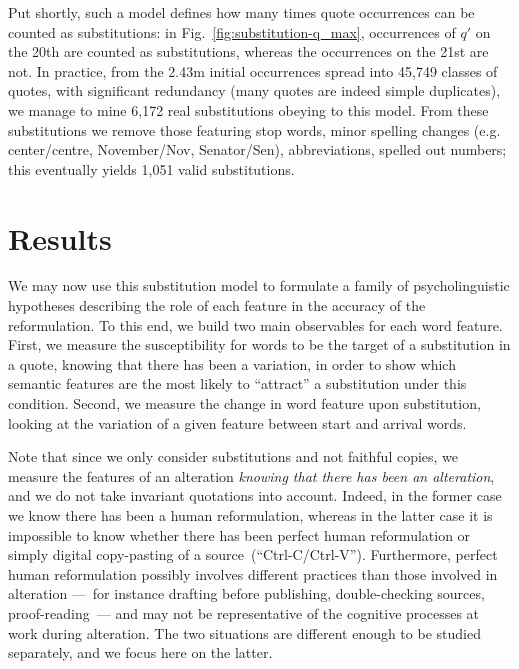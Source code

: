 \medskip
Put shortly, such a model defines how many times quote occurrences can be counted as substitutions: in Fig.~\ref{fig:substitution-q_max}, occurrences of $q'$ on the 20th are counted as substitutions, whereas the occurrences on the 21st are not.  In practice, from the 2.43m initial occurrences spread into 45,749 classes of quotes, with significant redundancy (many quotes are indeed simple duplicates), we manage to mine 6,172 real substitutions obeying to this model. From these substitutions we remove those featuring stop words, minor spelling changes (e.g. center/centre, November/Nov, Senator/Sen), abbreviations, spelled out numbers; this eventually yields 1,051 valid substitutions.


\section{Results}\label{sec:results}

We may now use this substitution model to formulate a family of psycholinguistic hypotheses describing the role of each feature in the accuracy of the reformulation.  To this end, we build two main observables for each word feature.
First, we measure the susceptibility for words to be the target of a substitution in a quote, knowing that there has been a variation, in order to show which semantic features are the most likely to ``attract'' a substitution under this condition. Second, we measure the change in word feature upon substitution, looking at the variation of a given feature between start and arrival words.

Note that since we only consider substitutions and not faithful copies, we measure the features of an alteration \emph{knowing that there has been an alteration}, and we do not take invariant quotations into account.
Indeed, in the former case we know there has been a human reformulation, whereas in the latter case it is impossible to know whether there has been perfect human reformulation or simply digital copy-pasting of a source~(``{\sc Ctrl-C}/{\sc Ctrl-V}'').
Furthermore, perfect human reformulation possibly involves different practices than those involved in alteration ---~for instance drafting before publishing, double-checking sources, proof-reading~--- and may not be representative of the cognitive processes at work during alteration.
The two situations are different enough to be studied separately, and we focus here on the latter.

